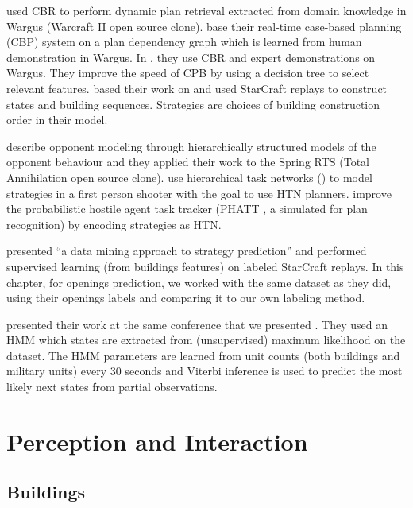 \cite{LTW} used CBR to perform dynamic plan retrieval extracted from domain knowledge in Wargus (Warcraft II open source clone). \cite{CBR_Planning} base their real-time case-based planning (CBP) system on a plan dependency graph which is learned from human demonstration in Wargus. In \citep{OntanonCBR,PlanRetrieval}, they use CBR and expert demonstrations on Wargus. %
They improve the speed of CPB by using a decision tree to select relevant features. \cite{HsiehS08} based their work on \citep{LTW} and used StarCraft replays to construct states and building sequences. Strategies are choices of building construction order in their model. 

\cite{schadd2007opponent} describe opponent modeling through hierarchically structured models of the opponent behaviour and they applied their work to the Spring RTS (Total Annihilation open source clone). \cite{HTNPlanning} use hierarchical task networks () to model strategies in a first person shooter with the goal to use HTN planners. \cite{Kabanza2010} improve the probabilistic hostile agent task tracker (PHATT \citep{PHATT}, a simulated  for plan recognition) by encoding strategies as HTN. 

\cite{weberStrat} presented ``a data mining approach to strategy prediction'' and performed supervised learning (from buildings features) on labeled StarCraft replays. In this chapter, for openings prediction, we worked with the same dataset as they did, using their openings labels and comparing it to our own labeling method. %

\cite{HMMstrat_RTS_AIIDE11} presented their work at the same conference that we presented \citep{SYNNAEVE:StratPred}. They used an HMM which states are extracted from (unsupervised) maximum likelihood on the dataset. The HMM parameters are learned from unit counts (both buildings and military units) every 30 seconds and Viterbi inference is used to predict the most likely next states from partial observations. 


\section{Perception and Interaction}

\subsection{Buildings}
\label{sec:buildings}

